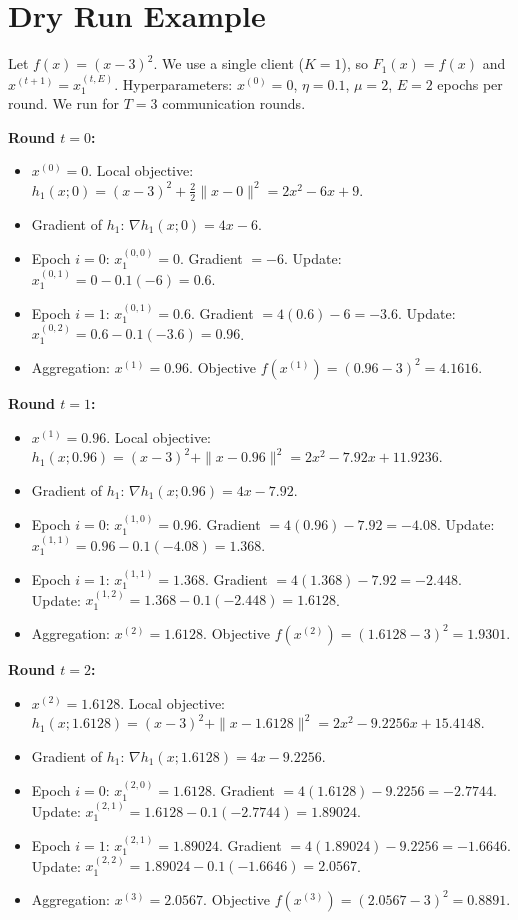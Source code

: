 \documentclass{article}
\begin{document}
\section*{Dry Run Example}
Let $f(x) = (x-3)^2$. We use a single client ($K=1$), so $F_1(x) = f(x)$ and $x^{(t+1)} = x_1^{(t, E)}$. Hyperparameters: $x^{(0)} = 0$, $\eta = 0.1$, $\mu = 2$, $E = 2$ epochs per round. We run for $T=3$ communication rounds.

\textbf{Round $t=0$:}
\begin{itemize}
\item $x^{(0)} = 0$. Local objective: $h_1(x; 0) = (x-3)^2 + \frac{2}{2}\|x - 0\|^2 = 2x^2 - 6x + 9$.
\item Gradient of $h_1$: $\nabla h_1(x; 0) = 4x - 6$.
\item Epoch $i=0$: $x_1^{(0,0)} = 0$. Gradient $= -6$. Update: $x_1^{(0,1)} = 0 - 0.1(-6) = 0.6$.
\item Epoch $i=1$: $x_1^{(0,1)} = 0.6$. Gradient $= 4(0.6) - 6 = -3.6$. Update: $x_1^{(0,2)} = 0.6 - 0.1(-3.6) = 0.96$.
\item Aggregation: $x^{(1)} = 0.96$. Objective $f(x^{(1)}) = (0.96-3)^2 = 4.1616$.
\end{itemize}

\textbf{Round $t=1$:}
\begin{itemize}
\item $x^{(1)} = 0.96$. Local objective: $h_1(x; 0.96) = (x-3)^2 + \|x - 0.96\|^2 = 2x^2 - 7.92x + 11.9236$.
\item Gradient of $h_1$: $\nabla h_1(x; 0.96) = 4x - 7.92$.
\item Epoch $i=0$: $x_1^{(1,0)} = 0.96$. Gradient $= 4(0.96) - 7.92 = -4.08$. Update: $x_1^{(1,1)} = 0.96 - 0.1(-4.08) = 1.368$.
\item Epoch $i=1$: $x_1^{(1,1)} = 1.368$. Gradient $= 4(1.368) - 7.92 = -2.448$. Update: $x_1^{(1,2)} = 1.368 - 0.1(-2.448) = 1.6128$.
\item Aggregation: $x^{(2)} = 1.6128$. Objective $f(x^{(2)}) = (1.6128-3)^2 = 1.9301$.
\end{itemize}

\textbf{Round $t=2$:}
\begin{itemize}
\item $x^{(2)} = 1.6128$. Local objective: $h_1(x; 1.6128) = (x-3)^2 + \|x - 1.6128\|^2 = 2x^2 - 9.2256x + 15.4148$.
\item Gradient of $h_1$: $\nabla h_1(x; 1.6128) = 4x - 9.2256$.
\item Epoch $i=0$: $x_1^{(2,0)} = 1.6128$. Gradient $= 4(1.6128) - 9.2256 = -2.7744$. Update: $x_1^{(2,1)} = 1.6128 - 0.1(-2.7744) = 1.89024$.
\item Epoch $i=1$: $x_1^{(2,1)} = 1.89024$. Gradient $= 4(1.89024) - 9.2256 = -1.6646$. Update: $x_1^{(2,2)} = 1.89024 - 0.1(-1.6646) = 2.0567$.
\item Aggregation: $x^{(3)} = 2.0567$. Objective $f(x^{(3)}) = (2.0567-3)^2 = 0.8891$.
\end{itemize}
\end{document}
